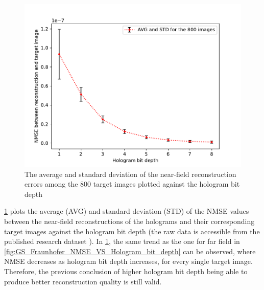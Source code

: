 	\begin{figure} [H]
	   \begin{center}
	   \includegraphics[width = \textwidth]{GS_Fraunhofer_NMSE_VS_Hologram bit depth.pdf}
	   \end{center}
	   \caption{\label{fig:GS_Fresnel0.1_NMSE_VS_Hologram_bit_depth} The average and standard deviation of the near-field reconstruction errors among the 800 target images plotted against the hologram bit depth}
	\end{figure}

	\cref{fig:GS_Fresnel0.1_NMSE_VS_Hologram_bit_depth} plots the average (AVG) and standard deviation (STD) of the NMSE values between the near-field reconstructions of the holograms and their corresponding target images against the hologram bit depth (the raw data is accessible from the published research dataset \cite{research_data_Sha2024}). In \cref{fig:GS_Fresnel0.1_NMSE_VS_Hologram_bit_depth}, the same trend as the one for far field in \cref{fig:GS_Fraunhofer_NMSE_VS_Hologram_bit_depth} can be observed, where NMSE decreases as hologram bit depth increases, for every single target image. Therefore, the previous conclusion of higher hologram bit depth being able to produce better reconstruction quality is still valid.


